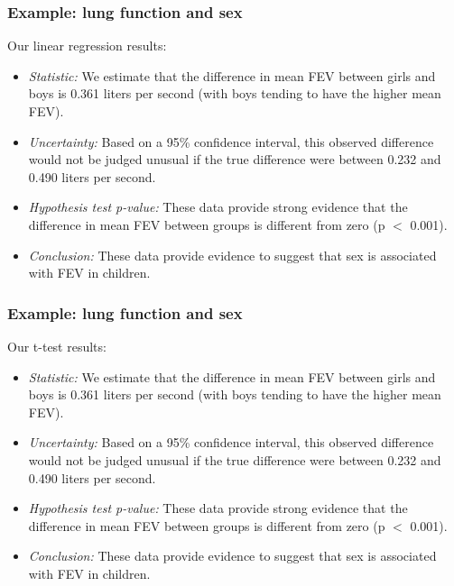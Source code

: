 \documentclass[12pt, 
hyperref={colorlinks=true, linkcolor=blue, urlcolor=cyan}]{beamer}
\begin{document}
\begin{frame}
\frametitle{Example: lung function and sex}

Our linear regression results:

\begin{itemize}
\item \textit{Statistic:} We estimate that the difference in mean FEV between girls and boys is 0.361 liters per second (with boys tending to have the higher mean FEV). \pause
\item \textit{Uncertainty:} Based on a 95\% confidence interval, this observed difference would not be judged unusual if the true difference were between 0.232 and 0.490 liters per second.\pause
\item \textit{Hypothesis test p-value:} These data provide strong evidence that the difference in mean FEV between groups is different from zero (p $<$ 0.001).\pause
\item \textit{Conclusion:} These data provide evidence to suggest that sex is associated with FEV in children.
\end{itemize}

\end{frame}

\begin{frame}
\frametitle{Example: lung function and sex}

Our t-test results: 

\begin{itemize}
\item \textit{Statistic:} We estimate that the difference in mean FEV between girls and boys is 0.361 liters per second (with boys tending to have the higher mean FEV). 
\item \textit{Uncertainty:} Based on a 95\% confidence interval, this observed difference would not be judged unusual if the true difference were between 0.232 and 0.490 liters per second.
\item \textit{Hypothesis test p-value:} These data provide strong evidence that the difference in mean FEV between groups is different from zero (p $<$ 0.001).
\item \textit{Conclusion:} These data provide evidence to suggest that sex is associated with FEV in children.
\end{itemize}

\end{frame}
\end{document}
